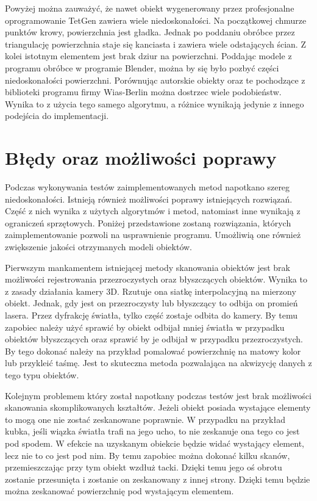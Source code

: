 Powyżej można zauważyć, że nawet obiekt wygenerowany przez profesjonalne oprogramowanie TetGen zawiera wiele niedoskonałości. Na początkowej chmurze punktów krowy, powierzchnia jest gładka. Jednak po poddaniu obróbce przez triangulację powierzchnia staje się kanciasta i zawiera wiele odstających ścian. Z kolei istotnym elementem jest brak dziur na powierzchni. Poddając modele z programu obróbce w programie Blender, można by się było pozbyć części niedoskonałości powierzchni. Porównując autorskie obiekty oraz te pochodzące z biblioteki programu firmy Wias-Berlin można dostrzec wiele podobieństw. Wynika to z użycia tego samego algorytmu, a różnice wynikają jedynie z innego podejścia do implementacji.


\section{Błędy oraz możliwości poprawy}
Podczas wykonywania testów zaimplementowanych metod napotkano szereg niedoskonałości. Istnieją również możliwości poprawy istniejących rozwiązań. Część z nich wynika z użytych algorytmów i metod, natomiast inne wynikają z ograniczeń sprzętowych. Poniżej przedstawione zostaną rozwiązania, których zaimplementowanie pozwoli na usprawnienie programu. Umożliwią one również zwiększenie jakości otrzymanych modeli obiektów.

Pierwszym mankamentem istniejącej metody skanowania obiektów jest brak możliwości rejestrowania przezroczystych oraz błyszczących obiektów. Wynika to z zasady działania kamery 3D. Rzutuje ona siatkę interpolacyjną na mierzony obiekt. Jednak, gdy jest on przezroczysty lub błyszczący to odbija on promień lasera. Przez dyfrakcję światła, tylko część zostaje odbita do kamery. By temu zapobiec należy użyć sprawić by obiekt odbijał mniej światła w przypadku obiektów błyszczących oraz sprawić by je odbijał w przypadku przezroczystych. By tego dokonać należy na przykład pomalować powierzchnię na matowy kolor lub przykleić taśmę. Jest to skuteczna metoda pozwalająca na akwizycję danych z tego typu obiektów. 

Kolejnym problemem który został napotkany podczas testów jest brak możliwości skanowania skomplikowanych kształtów. Jeżeli obiekt posiada wystające elementy to mogą one nie zostać zeskanowane poprawnie. W przypadku na przykład kubka, jeśli wiązka światła trafi na jego ucho, to nie zeskanuje ona tego co jest pod spodem. W efekcie na uzyskanym obiekcie będzie widać wystający element, lecz nie to co jest pod nim. By temu zapobiec można dokonać kilku skanów, przemieszczając przy tym obiekt wzdłuż tacki. Dzięki temu jego oś obrotu zostanie przesunięta i zostanie on zeskanowany z innej strony. Dzięki temu będzie można zeskanować powierzchnię pod wystającym elementem.

